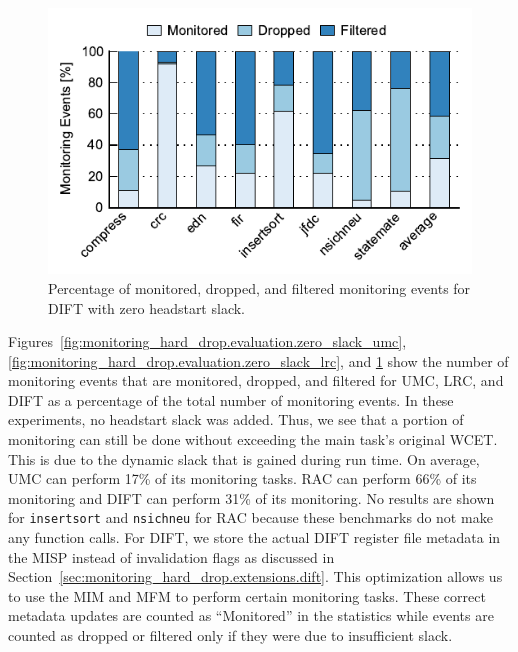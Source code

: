 \begin{figure}
  \begin{center}
    \includegraphics{monitoring_hard_drop/data/zero_slack_dift.pdf}
    \caption{Percentage of monitored, dropped, and filtered monitoring events
    for DIFT with zero headstart slack.}
    \label{fig:monitoring_hard_drop.evaluation.zero_slack_dift}
  \end{center}
\end{figure}

Figures~\ref{fig:monitoring_hard_drop.evaluation.zero_slack_umc},
\ref{fig:monitoring_hard_drop.evaluation.zero_slack_lrc}, and
\ref{fig:monitoring_hard_drop.evaluation.zero_slack_dift} show the number of
monitoring events that are monitored, dropped, and filtered for UMC, LRC, and
DIFT as a percentage of the total number of monitoring events. In these
experiments, no headstart slack was added. Thus, we see that a portion of
monitoring can
still be done without exceeding the main task's original WCET. This is due to the
dynamic slack that is gained during run time. On average, UMC can perform 17\%
of its monitoring tasks. RAC can perform 66\% of its monitoring and DIFT can
perform 31\% of its monitoring.  No results are shown for {\tt insertsort} and
{\tt nsichneu} for RAC because these benchmarks do not make any function calls.
For DIFT, we store the actual DIFT register file metadata in the MISP instead
of invalidation flags as discussed in
Section~\ref{sec:monitoring_hard_drop.extensions.dift}. This optimization
allows us to use the MIM and MFM to
perform certain monitoring tasks. These correct metadata updates are counted as
``Monitored'' in the statistics while events are counted as dropped or filtered
only if they were due to insufficient slack.

